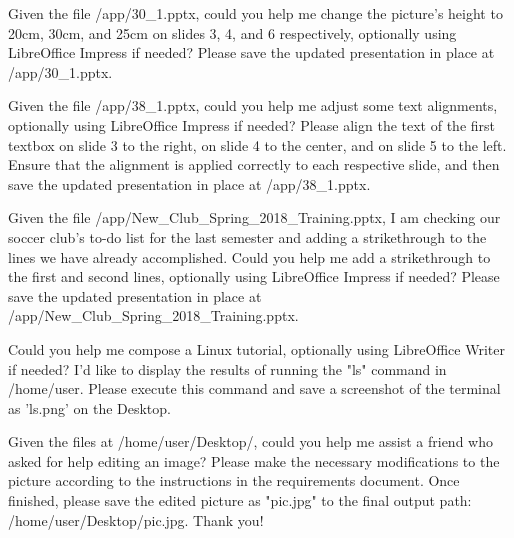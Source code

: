 \begin{instructionbox}
Given the file \textasciigrave{}/app/30\_1.pptx\textasciigrave{}, could you help me change the picture's height to 20cm, 30cm, and 25cm on slides 3, 4, and 6 respectively, optionally using LibreOffice Impress if needed? Please save the updated presentation in place at \textasciigrave{}/app/30\_1.pptx\textasciigrave{}.
\end{instructionbox}

\begin{instructionbox}
Given the file \textasciigrave{}/app/38\_1.pptx\textasciigrave{}, could you help me adjust some text alignments, optionally using LibreOffice Impress if needed? Please align the text of the first textbox on slide 3 to the right, on slide 4 to the center, and on slide 5 to the left. Ensure that the alignment is applied correctly to each respective slide, and then save the updated presentation in place at \textasciigrave{}/app/38\_1.pptx\textasciigrave{}.
\end{instructionbox}

\begin{instructionbox}
Given the file \textasciigrave{}/app/New\_Club\_Spring\_2018\_Training.pptx\textasciigrave{}, I am checking our soccer club's to-do list for the last semester and adding a strikethrough to the lines we have already accomplished. Could you help me add a strikethrough to the first and second lines, optionally using LibreOffice Impress if needed? Please save the updated presentation in place at \textasciigrave{}/app/New\_Club\_Spring\_2018\_Training.pptx\textasciigrave{}.
\end{instructionbox}

\begin{instructionbox}
Could you help me compose a Linux tutorial, optionally using LibreOffice Writer if needed? I'd like to display the results of running the "ls" command in /home/user. Please execute this command and save a screenshot of the terminal as 'ls.png' on the Desktop.
\end{instructionbox}

\begin{instructionbox}
Given the files at \textasciigrave{}/home/user/Desktop/\textasciigrave{}, could you help me assist a friend who asked for help editing an image? Please make the necessary modifications to the picture according to the instructions in the requirements document. Once finished, please save the edited picture as "pic.jpg" to the final output path: \textasciigrave{}/home/user/Desktop/pic.jpg\textasciigrave{}. Thank you!
\end{instructionbox}

